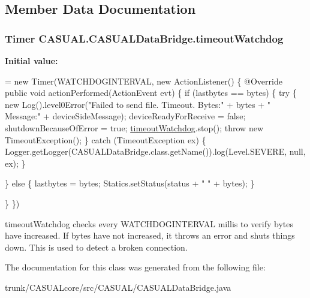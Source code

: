 \subsection{Member Data Documentation}
\hypertarget{classCASUAL_1_1CASUALDataBridge_a2f95d8ec4d06f75bf5e089658604e46d}{
\subsubsection[{timeout\-Watchdog}]{\setlength{\rightskip}{0pt plus 5cm}Timer C\-A\-S\-U\-A\-L.\-C\-A\-S\-U\-A\-L\-Data\-Bridge.\-timeout\-Watchdog\hspace{0.3cm}{\ttfamily [static]}}}\label{classCASUAL_1_1CASUALDataBridge_a2f95d8ec4d06f75bf5e089658604e46d}
{\bfseries Initial value\-:}
\begin{DoxyCode}
= \textcolor{keyword}{new} Timer(WATCHDOGINTERVAL, \textcolor{keyword}{new} ActionListener() \{
        @Override
        \textcolor{keyword}{public} \textcolor{keywordtype}{void} actionPerformed(ActionEvent evt) \{
            \textcolor{keywordflow}{if} (lastbytes == bytes) \{
                \textcolor{keywordflow}{try} \{
                    \textcolor{keyword}{new} Log().level0Error(\textcolor{stringliteral}{"Failed to send file.  Timeout. Bytes:"} + bytes + \textcolor{stringliteral}{" Message:"} + 
      deviceSideMessage);
                    deviceReadyForReceive = \textcolor{keyword}{false};
                    shutdownBecauseOfError = \textcolor{keyword}{true};
                    \hyperlink{classCASUAL_1_1CASUALDataBridge_a2f95d8ec4d06f75bf5e089658604e46d}{timeoutWatchdog}.stop();
                    \textcolor{keywordflow}{throw} \textcolor{keyword}{new} TimeoutException();
                \} \textcolor{keywordflow}{catch} (TimeoutException ex) \{
                    Logger.getLogger(CASUALDataBridge.class.getName()).log(Level.SEVERE, null, ex);
                \}

            \} \textcolor{keywordflow}{else} \{
                lastbytes = bytes;
                Statics.setStatus(status + \textcolor{stringliteral}{" "} + bytes);
            \}

        \}
    \})
\end{DoxyCode}
timeout\-Watchdog checks every W\-A\-T\-C\-H\-D\-O\-G\-I\-N\-T\-E\-R\-V\-A\-L millis to verify bytes have increased. If bytes have not increased, it throws an error and shuts things down. This is used to detect a broken connection. 

The documentation for this class was generated from the following file\-:\begin{DoxyCompactItemize}
\item 
trunk/\-C\-A\-S\-U\-A\-Lcore/src/\-C\-A\-S\-U\-A\-L/C\-A\-S\-U\-A\-L\-Data\-Bridge.\-java\end{DoxyCompactItemize}
